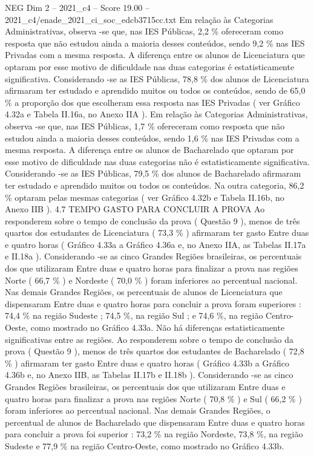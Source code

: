 \begin{textsample}{NEG Dim 2 – 2021\_c4 – Score 19.00 – 2021\_c4/enade\_2021\_ci\_soc\_edcb3715cc.txt}
Em relação às Categorias Administrativas, observa -se que, nas IES Públicas, 2,2 \% ofereceram como resposta que não estudou ainda a maioria desses conteúdos, sendo 9,2 \% nas IES Privadas com a mesma resposta.
A diferença entre os alunos de Licenciatura que optaram por esse motivo de dificuldade nas duas categorias é estatisticamente significativa.
Considerando -se as IES Públicas, 78,8 \% dos alunos de Licenciatura afirmaram ter estudado e aprendido muitos ou todos os conteúdos, sendo de 65,0 \% a proporção dos que escolheram essa resposta nas IES Privadas ( ver Gráfico 4.32a e Tabela II.16a, no Anexo IIA ).
Em relação às Categorias Administrativas, observa -se que, nas IES Públicas, 1,7 \% ofereceram como resposta que não estudou ainda a maioria desses conteúdos, sendo 1,6 \% nas IES Privadas com a mesma resposta.
A diferença entre os alunos de Bacharelado que optaram por esse motivo de dificuldade nas duas categorias não é estatisticamente significativa.
Considerando -se as IES Públicas, 79,5 \% dos alunos de Bacharelado afirmaram ter estudado e aprendido muitos ou todos os conteúdos.
Na outra categoria, 86,2 \% optaram pelas mesmas categorias ( ver Gráfico 4.32b e Tabela II.16b, no Anexo IIB ). 4.7 TEMPO GASTO PARA CONCLUIR A PROVA Ao responderem sobre o tempo de conclusão da prova ( Questão 9 ), menos de três quartos dos estudantes de Licenciatura ( 73,3 \% ) afirmaram ter gasto Entre duas e quatro horas ( Gráfico 4.33a a Gráfico 4.36a e, no Anexo IIA, as Tabelas II.17a e II.18a ).
Considerando -se as cinco Grandes Regiões brasileiras, os percentuais dos que utilizaram Entre duas e quatro horas para finalizar a prova nas regiões Norte ( 66,7 \% ) e Nordeste ( 70,0 \% ) foram inferiores ao percentual nacional.
Nas demais Grandes Regiões, os percentuais de alunos de Licenciatura que dispensaram Entre duas e quatro horas para concluir a prova foram superiores : 74,4 \% na região Sudeste ; 74,5 \%, na região Sul ; e 74,6 \%, na região Centro-Oeste, como mostrado no Gráfico 4.33a.
Não há diferenças estatisticamente significativas entre as regiões.
Ao responderem sobre o tempo de conclusão da prova ( Questão 9 ), menos de três quartos dos estudantes de Bacharelado ( 72,8 \% ) afirmaram ter gasto Entre duas e quatro horas ( Gráfico 4.33b a Gráfico 4.36b e, no Anexo IIB, as Tabelas II.17b e II.18b ).
Considerando -se as cinco Grandes Regiões brasileiras, os percentuais dos que utilizaram Entre duas e quatro horas para finalizar a prova nas regiões Norte ( 70,8 \% ) e Sul ( 66,2 \% ) foram inferiores ao percentual nacional.
Nas demais Grandes Regiões, o percentual de alunos de Bacharelado que dispensaram Entre duas e quatro horas para concluir a prova foi superior : 73,2 \% na região Nordeste, 73,8 \%, na região Sudeste e 77,9 \% na região Centro-Oeste, como mostrado no Gráfico 4.33b.

\end{textsample}
